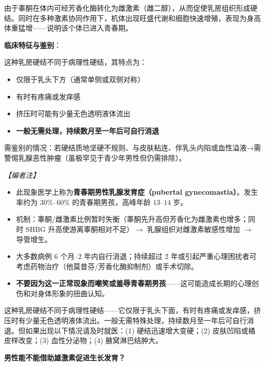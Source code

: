 \begin{enumerate}
由于睾酮在体内可经芳香化酶转化为雌激素（雌二醇），从而促使乳房组织形成硬结。同时在多种激素协同作用下，机体出现旺盛代谢和细胞快速增殖，表现为身高体重猛增——说明该个体已进入青春期。

\vspace{0.5em}
\noindent\textbf{临床特征与鉴别}：

这种乳房硬结不同于病理性硬结，其特点为：
\begin{itemize}
	\item 仅限于乳头下方（通常单侧或双侧对称）
	\item 有时有疼痛或发痒感
	\item 挤压时可能有少量无色透明液体流出
	\item \textbf{一般无需处理，持续数月至一年后可自行消退}
\end{itemize}

需鉴别的情况：若硬结质地坚硬不规则、与皮肤粘连、伴乳头内陷或血性溢液→需警惕乳腺恶性肿瘤（虽极罕见于青少年男性但仍需排除）。

\vspace{0.5em}
\noindent\textit{【编者注】}
\begin{itemize}
	\item 此现象医学上称为\textbf{青春期男性乳腺发育症（pubertal gynecomastia）}。发生率约为 $30\%$--$60\%$ 的青春期男孩，高峰年龄 $13$--$14$ 岁。
	\item 机制：睾酮/雌激素比例暂时失衡（睾酮先升高但芳香化为雌激素也增多；同时 SHBG 升高使游离睾酮相对不足）$\rightarrow$ 乳腺组织对雌激素敏感性增加 $\rightarrow$ 导管增生。
	\item 大多数病例 $6$ 个月--$2$ 年内自行消退；持续超过 2 年或引起严重心理困扰者可考虑药物治疗（他莫昔芬/芳香化酶抑制剂）或手术切除。
	\item \textbf{不要因为这一正常现象而嘲笑或羞辱青春期男孩}——这可能造成长期的心理创伤和对身体形象的扭曲认知。
\end{itemize}

\begin{tcolorbox}[colback=pink!5!white,colframe=red!50!black,title=贴心小叮咛]
这种乳房硬结不同于病理性硬结——它仅限于乳头下面，有时有疼痛或发痒感，挤压时有少量无色透明液体流出。一般无需特殊处理，持续数月至一年后可自行消退。但如果出现以下情况请及时就医：(1) 硬结迅速增大变硬；(2) 皮肤凹陷或橘皮样改变；(3) 血性分泌物；(4) 腋窝淋巴结肿大。
\end{tcolorbox}

\vspace{0.8em}
\noindent\textbf{男性能不能借助雄激素促进生长发育？}


\end{enumerate}
